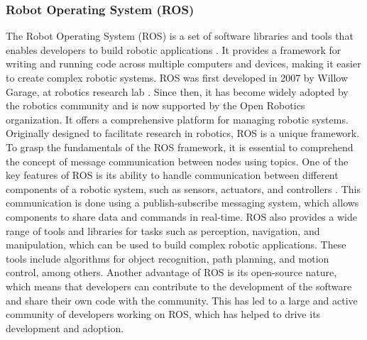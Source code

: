\documentclass[12pt,oneside]{article}
\begin{document}
\subsubsection{Robot Operating System (ROS)}
The Robot Operating System (ROS) is a set of software libraries and tools that enables developers to build robotic applications \cite{15_quigley2009ros}. It provides a framework for writing and running code across multiple computers and devices, making it easier to create complex robotic systems. ROS was first developed in 2007 by Willow Garage, at robotics research lab \cite{16_cousins2014willow}. Since then, it has become widely adopted by the robotics community and is now supported by the Open Robotics organization. It offers a comprehensive platform for managing robotic systems. Originally designed to facilitate research in robotics, ROS is a unique framework. To grasp the fundamentals of the ROS framework, it is essential to comprehend the concept of message communication between nodes using topics.
One of the key features of ROS is its ability to handle communication between different components of a robotic system, such as sensors, actuators, and controllers \cite{17_emmi2014new}. This communication is done using a publish-subscribe messaging system, which allows components to share data and commands in real-time. ROS also provides a wide range of tools and libraries for tasks such as perception, navigation, and manipulation, which can be used to build complex robotic applications. These tools include algorithms for object recognition, path planning, and motion control, among others. Another advantage of ROS is its open-source nature, which means that developers can contribute to the development of the software and share their own code with the community. This has led to a large and active community of developers working on ROS, which has helped to drive its development and adoption.
\end{document}
